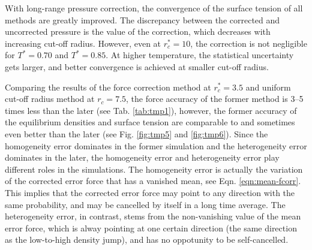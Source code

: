 \documentclass[aps,pre,preprint]{revtex4}
\begin{document}
With long-range pressure correction, the convergence of the surface
tension of all methods are greatly improved. The discrepancy between
the corrected and uncorrected pressure is the value of the correction,
which decreases with increasing cut-off radius. However, even at
$r_c^\ast=10$, the correction is not negligible for $T^\ast = 0.70$
and $T^\ast = 0.85$. At higher temperature, the statistical
uncertainty gets larger, and better convergence is achieved at smaller
cut-off radius.

Comparing the results of the force correction method at
$r_c^\ast = 3.5$ and uniform cut-off radius method at $r_c = 7.5$, the
force accuracy of the former method is 3--5 times less than the later
(see Tab. \ref{tab:tmp1}), however, the former accuracy of the
equilibrium densities and surface tension are comparable to and
sometimes even better than the later (see Fig. \ref{fig:tmp5} and
\ref{fig:tmp6}).
Since the homogeneity error dominates in the former simulation and the
heterogeneity error dominates in the later, the homogeneity error and
heterogeneity error play different roles in the simulations.  The
homogeneity error is actually the variation of the corrected error
force that has a vanished mean, see Eqn. \eqref{eqn:mean-fcorr}. This
implies that the corrected error force may point to any direction with
the same probability, and may be cancelled by itself in a long time
average.  The heterogeneity error, in contrast, stems from the
non-vanishing value of the mean error force, which is alway pointing
at one certain direction (the same direction as the low-to-high
density jump), and has no oppotunity to be self-cancelled.



\end{document}
